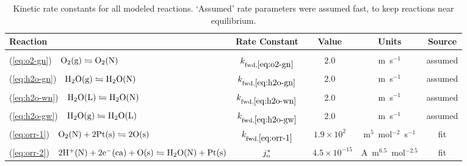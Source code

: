 \documentclass[final,3p,times,twocolumn]{elsarticle}    %
\begin{document}
\begin{table}[!ht]
    \small
    \centering
    \caption{Kinetic rate constants for all modeled reactions. `Assumed' rate parameters were assumed fast, to keep reactions near equilibrium.}
    \vspace*{1mm}
    
    \begin{tabular}{l c c c c}
    \hline \hline
    Reaction &Rate Constant               &Value         &Units      &Source \\
    \hline \vspace*{-3mm} \\
    (\ref{eq:o2-gn}) \,\, ${\rm O_2(g) \leftrightharpoons O_2(N)}$ &$k_{\rm fwd,\ref{eq:o2-gn}}$   &$2.0$ &m~s$^{-1}$ &assumed\\
    (\ref{eq:h2o-gn}) \,\, ${\rm H_2O(g) \leftrightharpoons H_2O(N)}$ &$k_{\rm fwd,\ref{eq:h2o-gn}}$ &$2.0$ &m~s$^{-1}$ &assumed\\
    (\ref{eq:h2o-wn}) \,\, ${\rm H_2O(L) \leftrightharpoons H_2O(N)}$ &$k_{\rm fwd,\ref{eq:h2o-wn}}$ &$2.0$ &m~s$^{-1}$ &assumed\\
    (\ref{eq:h2o-gw}) \,\, ${\rm H_2O(g) \leftrightharpoons H_2O(L)}$ &$k_{\rm fwd,\ref{eq:h2o-gw}}$ &$2.0$ &m~s$^{-1}$ &assumed\\
    (\ref{eq:orr-1}) \,\, ${\rm O_2(N) + 2Pt(s) \leftrightharpoons 2O(s)}$ & $k_{\rm fwd,\ref{eq:orr-1}}$ &$1.9\times10^{2}$ &m$^5$~mol$^{-2}$~s$^{-1}$ &fit\\
    (\ref{eq:orr-2}) \,\, ${\rm 2H^{+}(N) + 2e^{-}(ca) + O(s) \leftrightharpoons H_2O(N) + Pt(s)}$ &$j_{\rm o}^{*}$ &$\,\,\,\,4.5\times10^{-15}$ &A~m$^{6.5}$~mol$^{-2.5}$ &fit\\
    \hline \hline
    \end{tabular}
    \label{tab:kinetics}
\end{table}
\end{document}
